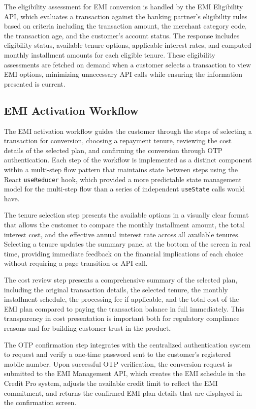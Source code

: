 The eligibility assessment for EMI conversion is handled by the EMI Eligibility API, which evaluates a transaction against the banking partner's eligibility rules based on criteria including the transaction amount, the merchant category code, the transaction age, and the customer's account status. The response includes eligibility status, available tenure options, applicable interest rates, and computed monthly installment amounts for each eligible tenure. These eligibility assessments are fetched on demand when a customer selects a transaction to view EMI options, minimizing unnecessary API calls while ensuring the information presented is current.

\subsection{EMI Activation Workflow}

The EMI activation workflow guides the customer through the steps of selecting a transaction for conversion, choosing a repayment tenure, reviewing the cost details of the selected plan, and confirming the conversion through OTP authentication. Each step of the workflow is implemented as a distinct component within a multi-step flow pattern that maintains state between steps using the React \texttt{useReducer} hook, which provided a more predictable state management model for the multi-step flow than a series of independent \texttt{useState} calls would have.

The tenure selection step presents the available options in a visually clear format that allows the customer to compare the monthly installment amount, the total interest cost, and the effective annual interest rate across all available tenures. Selecting a tenure updates the summary panel at the bottom of the screen in real time, providing immediate feedback on the financial implications of each choice without requiring a page transition or API call.

The cost review step presents a comprehensive summary of the selected plan, including the original transaction details, the selected tenure, the monthly installment schedule, the processing fee if applicable, and the total cost of the EMI plan compared to paying the transaction balance in full immediately. This transparency in cost presentation is important both for regulatory compliance reasons and for building customer trust in the product.

The OTP confirmation step integrates with the centralized authentication system to request and verify a one-time password sent to the customer's registered mobile number. Upon successful OTP verification, the conversion request is submitted to the EMI Management API, which creates the EMI schedule in the Credit Pro system, adjusts the available credit limit to reflect the EMI commitment, and returns the confirmed EMI plan details that are displayed in the confirmation screen.

